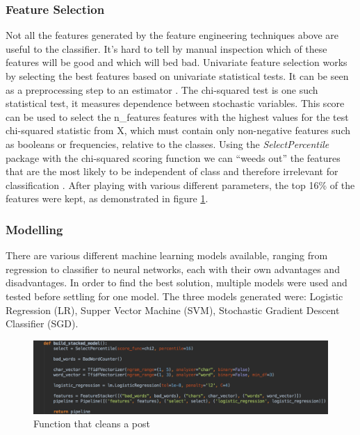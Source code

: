 \subsubsection{Feature Selection}
Not all the features generated by the feature engineering techniques above are useful to the classifier. It's hard to tell by manual inspection which of these features will be good and which will bed bad. Univariate feature selection works by selecting the best features based on univariate statistical tests. It can be seen as a preprocessing step to an estimator \cite{Scikit:FeatureSelection}. The chi-squared test is one such statistical test, it measures dependence between stochastic variables. This score can be used to select the n\_features features with the highest values for the test chi-squared statistic from X, which must contain only non-negative features such as booleans or frequencies, relative to the classes. Using the \textit{SelectPercentile} package with the chi-squared scoring function we can ``weeds out'' the features that are the most likely to be independent of class and therefore irrelevant for classification \cite{Scikit:SelectPercentile, Scikit:ChiSquared}. After playing with various different parameters, the top 16\% of the features were kept, as demonstrated in figure \ref{fig:AbuseDetection-Modelling}.

\subsubsection{Modelling}
There are various different machine learning models available, ranging from regression to classifier to neural networks, each with their own advantages and disadvantages. In order to find the best solution, multiple models were used and tested before settling for one model. The three models generated were: Logistic Regression (LR), Supper Vector Machine (SVM), Stochastic Gradient Descent Classifier (SGD).

\begin{figure}[H]
	\centering
	\includegraphics[width=\textwidth]{Images/Implementation/DataProcessing/AbuseDetection/Modelling}
	\caption{Function that cleans a post}
	\label{fig:AbuseDetection-Modelling}
\end{figure}

